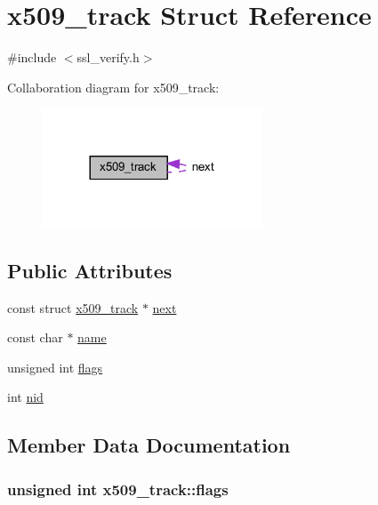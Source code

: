 \hypertarget{structx509__track}{}\section{x509\+\_\+track Struct Reference}
\label{structx509__track}


{\ttfamily \#include $<$ssl\+\_\+verify.\+h$>$}



Collaboration diagram for x509\+\_\+track\+:
\nopagebreak
\begin{figure}[H]
\begin{center}
\leavevmode
\includegraphics[width=185pt]{structx509__track__coll__graph}
\end{center}
\end{figure}
\subsection*{Public Attributes}
\begin{DoxyCompactItemize}
\item 
const struct \hyperlink{structx509__track}{x509\+\_\+track} $\ast$ \hyperlink{structx509__track_afc549262d7d58cf8df785fe0c26c4f48}{next}
\item 
const char $\ast$ \hyperlink{structx509__track_afe6b5788f3d6f2e75c1d64a37adabad4}{name}
\item 
unsigned int \hyperlink{structx509__track_af01606b793bd61566f7eea9b03e64170}{flags}
\item 
int \hyperlink{structx509__track_a2e1d7f7c62d481be8c5b77c59025043b}{nid}
\end{DoxyCompactItemize}


\subsection{Member Data Documentation}
\hypertarget{structx509__track_af01606b793bd61566f7eea9b03e64170}{}
\subsubsection[{flags}]{\setlength{\rightskip}{0pt plus 5cm}unsigned int x509\+\_\+track\+::flags}\label{structx509__track_af01606b793bd61566f7eea9b03e64170}
\hypertarget{structx509__track_afe6b5788f3d6f2e75c1d64a37adabad4}{}
